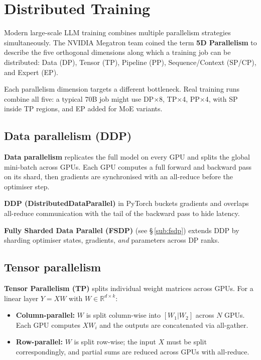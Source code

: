 
\section{Distributed Training}

Modern large-scale LLM training combines multiple parallelism strategies simultaneously.
The NVIDIA Megatron team coined the term \textbf{5D Parallelism} to describe the five
orthogonal dimensions along which a training job can be distributed: Data (DP), Tensor
(TP), Pipeline (PP), Sequence/Context (SP/CP), and Expert (EP).

\begin{notebox}
  Each parallelism dimension targets a different bottleneck. Real training runs combine
  all five: a typical 70B job might use DP$\times$8, TP$\times$4, PP$\times$4, with
  SP inside TP regions, and EP added for MoE variants.
\end{notebox}

\subsection{Data parallelism (DDP)}

\textbf{Data parallelism} replicates the full model on every GPU and splits the global
mini-batch across GPUs. Each GPU computes a full forward and backward pass on its shard,
then gradients are synchronised with an all-reduce before the optimiser step.

\textbf{DDP (DistributedDataParallel)} in PyTorch buckets gradients and overlaps
all-reduce communication with the tail of the backward pass to hide latency.

\textbf{Fully Sharded Data Parallel (FSDP)} (see \S\,\ref{sub:fsdp}) extends DDP by
sharding optimiser states, gradients, \emph{and} parameters across DP ranks.

\subsection{Tensor parallelism}

\textbf{Tensor Parallelism (TP)} splits individual weight matrices across GPUs.
For a linear layer $Y = XW$ with $W \in \mathbb{R}^{d \times k}$:

\begin{itemize}
  \item \textbf{Column-parallel:} $W$ is split column-wise into $[W_1 | W_2]$ across
    $N$ GPUs. Each GPU computes $XW_i$ and the outputs are concatenated via all-gather.
  \item \textbf{Row-parallel:} $W$ is split row-wise; the input $X$ must be split
    correspondingly, and partial sums are reduced across GPUs with all-reduce.
\end{itemize}

